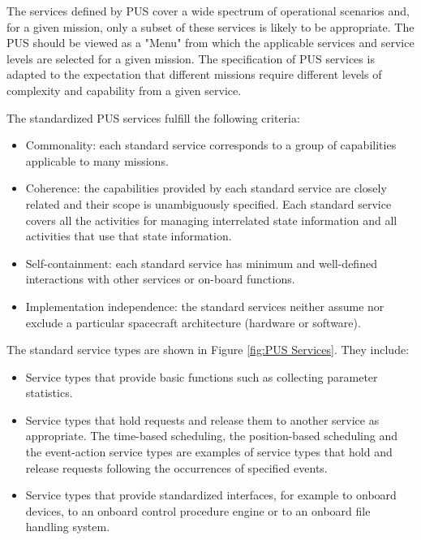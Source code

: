 The services defined by PUS cover a wide spectrum of operational scenarios and, for a given mission, only a subset of these services is likely to be appropriate. The PUS should be viewed as a "Menu" from which the applicable services and service levels are selected for a given mission. The specification of PUS services is adapted to the expectation that different missions require different levels of complexity and capability from a given service. 

The standardized PUS services fulfill the following criteria:
\begin{itemize}
\item Commonality: each standard service corresponds to a group of capabilities applicable to many missions.
\item Coherence: the capabilities provided by each standard service are closely related and their scope is unambiguously specified. Each standard service covers all the activities for managing interrelated state information and all activities that use that state information.
\item Self-containment: each standard service has minimum and well-defined interactions with other services or on-board functions.
\item Implementation independence: the standard services neither assume nor exclude a particular spacecraft architecture (hardware or software).
\end{itemize}

The standard service types are shown in Figure \ref{fig:PUS Services}. They include:

\begin{itemize}
\item Service types that provide basic functions such as collecting parameter statistics.
\item Service types that hold requests and release them to another service as appropriate. The time-based scheduling, the position-based scheduling and the event-action service types are examples of service types that hold and release requests following the occurrences of specified events.
\item Service types that provide standardized interfaces, for example to onboard devices, to an onboard control procedure engine or to an onboard file handling system.
\end{itemize}

